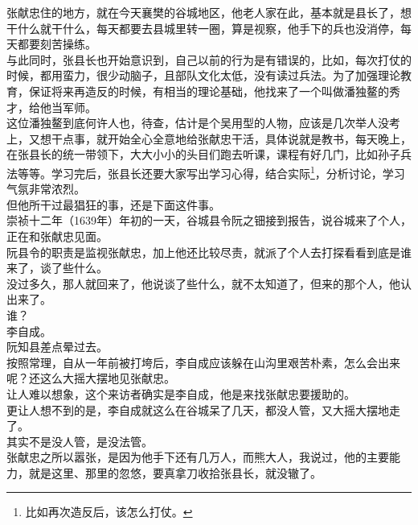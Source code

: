 \begin{multicols}{\theparacolNo}
张献忠住的地方，就在今天襄樊的谷城地区，他老人家在此，基本就是县长了，想干什么就干什么，每天都要去县城里转一圈，算是视察，他手下的兵也没消停，每天都要刻苦操练。\\

与此同时，张县长也开始意识到，自己以前的行为是有错误的，比如，每次打仗的时候，都用蛮力，很少动脑子，且部队文化太低，没有读过兵法。为了加强理论教育，保证将来再造反的时候，有相当的理论基础，他找来了一个叫做潘独鳌的秀才，给他当军师。\\

这位潘独鳌到底何许人也，待查，估计是个吴用型的人物，应该是几次举人没考上，又想干点事，就开始全心全意地给张献忠干活，具体说就是教书，每天晚上，在张县长的统一带领下，大大小小的头目们跑去听课，课程有好几门，比如孙子兵法等等。学习完后，张县长还要大家写出学习心得，结合实际\footnote{比如再次造反后，该怎么打仗。}，分析讨论，学习气氛非常浓烈。\\

但他所干过最猖狂的事，还是下面这件事。\\

崇祯十二年（1639年）年初的一天，谷城县令阮之钿接到报告，说谷城来了个人，正在和张献忠见面。\\

阮县令的职责是监视张献忠，加上他还比较尽责，就派了个人去打探看看到底是谁来了，谈了些什么。\\

没过多久，那人就回来了，他说谈了些什么，就不太知道了，但来的那个人，他认出来了。\\

谁？\\

李自成。\\

阮知县差点晕过去。\\

按照常理，自从一年前被打垮后，李自成应该躲在山沟里艰苦朴素，怎么会出来呢？还这么大摇大摆地见张献忠。\\

让人难以想象，这个来访者确实是李自成，他是来找张献忠要援助的。\\

更让人想不到的是，李自成就这么在谷城呆了几天，都没人管，又大摇大摆地走了。\\

其实不是没人管，是没法管。\\

张献忠之所以嚣张，是因为他手下还有几万人，而熊大人，我说过，他的主要能力，就是这里、那里的忽悠，要真拿刀收拾张县长，就没辙了。\\


\end{multicols}
